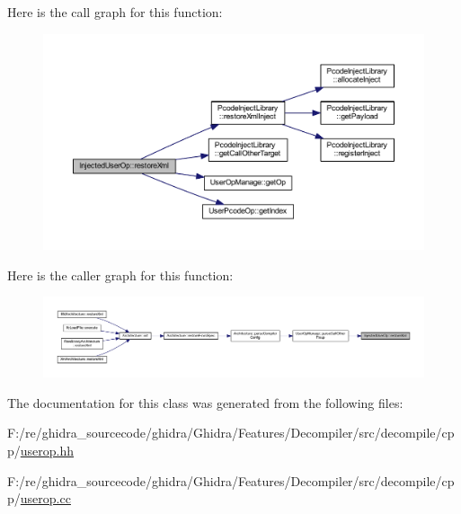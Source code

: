 Here is the call graph for this function\+:
\nopagebreak
\begin{figure}[H]
\begin{center}
\leavevmode
\includegraphics[width=350pt]{class_injected_user_op_ae0eb3ef1744912d47b0fd5f01c079515_cgraph}
\end{center}
\end{figure}
Here is the caller graph for this function\+:
\nopagebreak
\begin{figure}[H]
\begin{center}
\leavevmode
\includegraphics[width=350pt]{class_injected_user_op_ae0eb3ef1744912d47b0fd5f01c079515_icgraph}
\end{center}
\end{figure}


The documentation for this class was generated from the following files\+:\begin{DoxyCompactItemize}
\item 
F\+:/re/ghidra\+\_\+sourcecode/ghidra/\+Ghidra/\+Features/\+Decompiler/src/decompile/cpp/\mbox{\hyperlink{userop_8hh}{userop.\+hh}}\item 
F\+:/re/ghidra\+\_\+sourcecode/ghidra/\+Ghidra/\+Features/\+Decompiler/src/decompile/cpp/\mbox{\hyperlink{userop_8cc}{userop.\+cc}}\end{DoxyCompactItemize}
